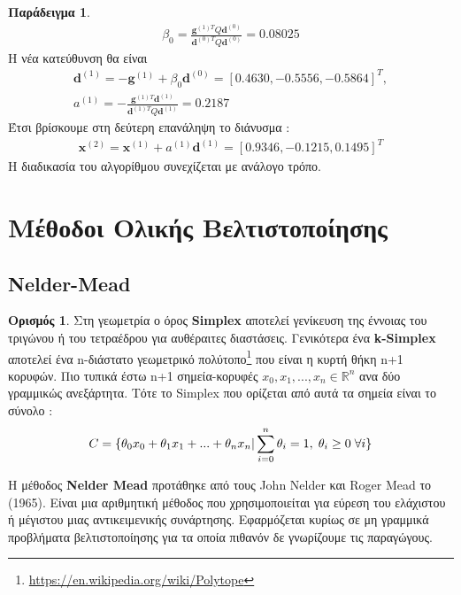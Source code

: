 \documentclass[a4paper,12pt,twoside]{report}
\theoremstyle{plain}
\theoremstyle{definition}
\newtheorem{defn}{Ορισμός}[section] %
\newtheorem{exmp}{Παράδειγμα}[section] %
\theoremstyle{remark}
\begin{document}
\begin{exmp}
\begin{align*}
\beta _0 = \frac{\textbf{g}^{(1)T}Q\textbf{d}^{(0)}}{\textbf{d}^{(0)T}Q\textbf{d}^{(0)}} = 0.08025
\end{align*}
H νέα κατεύθυνση θα είναι 
\begin{align*}
\textbf{d}^{(1)} = -\textbf{g}^{(1)} + \beta _0 \textbf{d}^{(0)} = [0.4630, -0.5556, -0.5864]^T,\\
a^{(1)} = -\frac{\textbf{g}^{(1)T}\textbf{d}^{(1)}}{\textbf{d}^{(1)T}Q\textbf{d}^{(1)}} = 0.2187
\end{align*}
Έτσι βρίσκουμε στη δεύτερη επανάληψη το διάνυσμα :
\begin{align*}
\textbf{x}^{(2)} = \textbf{x}^{(1)} + a^{(1)}\textbf{d}^{(1)} = [0.9346, -0.1215, 0.1495]^T
\end{align*}
H διαδικασία του αλγορίθμου συνεχίζεται με ανάλογο τρόπο.
\end{exmp}


\section{Μέθοδοι Ολικής Βελτιστοποίησης}
\subsection{Nelder-Mead}
\begin{defn}
Στη γεωμετρία ο όρος \textbf{Simplex} αποτελεί γενίκευση της έννοιας του τριγώνου ή του τετραέδρου για αυθέραιτες διαστάσεις. Γενικότερα ένα \textbf{k-Simplex} αποτελεί ένα n-διάστατο γεωμετρικό πολύτοπο\footnote{\url{https://en.wikipedia.org/wiki/Polytope}} που είναι η κυρτή θήκη n+1 κορυφών. Πιο τυπικά έστω n+1 σημεία-κορυφές $x_0,x_1,...,x_n \in \mathbb{R}^n$ ανα δύο γραμμικώς ανεξάρτητα. Τότε το Simplex που ορίζεται από αυτά τα σημεία είναι το σύνολο :
\begin{align}
C = \{\theta _0 x_0 + \theta _1 x_1 + ...  + \theta _n x_n | \sum_{i=0}^{n}\theta _i = 1, \hspace{0.1cm} \theta _i \geq 0 \hspace{0.1cm} \forall i\}
\end{align}
\end{defn}

H μέθοδος \textbf{Nelder Mead} \cite{kelley1999iterative}  προτάθηκε από τους  John Nelder και Roger Mead το (1965). Είναι μια αριθμητική μέθοδος που χρησιμοποιείται για εύρεση του ελάχιστου ή μέγιστου μιας αντικειμενικής συνάρτησης. Εφαρμόζεται κυρίως σε μη γραμμικά προβλήματα βελτιστοποίησης για τα οποία πιθανόν δε γνωρίζουμε τις παραγώγους. 
\end{document}
